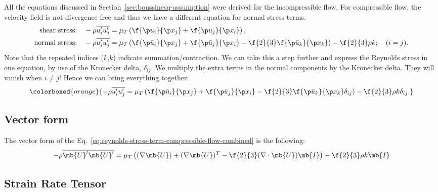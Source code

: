 All the equations discussed in Section~\ref{sec:boussinesq-assumption} were derived for the incompressible flow.
For compressible flow, the velocity field is not divergence free and thus we have a different equation for normal stress terms.
%
\begin{equation}
  \begin{aligned}
    \text{shear stress:}&\quad
    -\rho \overline{u^\prime_i u^\prime_j} = \mu_T \left(\f{\p \bar{u}_i}{\p x_j} + \f{\p \bar{u}_j}{\p x_i}\right), \\
  \text{normal stress:}&\quad
    -\rho \overline{u^\prime_i u^\prime_j}
    =
    \mu_T \left(\f{\p \bar{u}_i}{\p x_j} + \f{\p \bar{u}_j}{\p x_i} - \f{2}{3} \f{\p \bar{u}_k}{\p x_k} \right)
    - \f{2}{3} \rho k; \quad (i = j).
  \end{aligned}
  \label{eq:reynolds-stress-compressible-flow}
\end{equation}
%
Note that the repeated indices (\(k\),\(k\)) indicate summation/contraction.
We can take this a step further and express the Reynolds stress in one equation, by use of the Kronecker delta, \(\delta_{ij}\).
We multiply the extra terms in the normal components by the Kronecker delta.
They will vanish when \(i \neq j\)!
Hence we can bring everything together:
%
\begin{equation}
  \colorboxed{orange}{
    -\rho \overline{u^\prime_i u^\prime_j}
    =
    \mu_T \left(\f{\p \bar{u}_i}{\p x_j} + \f{\p \bar{u}_j}{\p x_i} - \f{2}{3} \f{\p \bar{u}_k}{\p x_k} \delta_{ij} \right)
    - \f{2}{3} \rho k \delta_{ij}.
  }
  \label{eq:reynolds-stress-term-compressible-flow-combined}
\end{equation}


\subsection{Vector form}

The vector form of the Eq.~\ref{eq:reynolds-stress-term-compressible-flow-combined} is the following:
%
\begin{equation}
  -\rho \overline{\mb{U}^\prime \mb{U}^\prime}
  =
  \mu_T \left(
    (\nabla \mb{U}) + (\nabla \mb{U})^T - \f{2}{3} (\nabla \cdot \mb{U}) \mb{I}
  \right)
  - \f{2}{3} \rho k \mb{I}
  \label{eq:reynolds-stress-term-vector-form}
\end{equation}


\subsection{Strain Rate Tensor}

